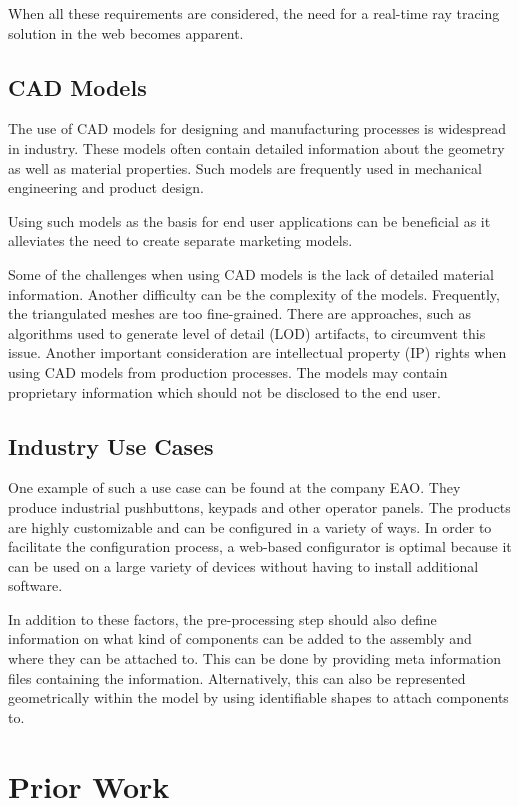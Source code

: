 When all these requirements are considered, the need for a real-time ray tracing solution in the web becomes apparent.

\subsection{CAD Models}

The use of CAD models for designing and manufacturing processes is widespread in industry. These models often contain detailed information about the geometry as well as material properties. Such models are frequently used in mechanical engineering and product design.

Using such models as the basis for end user applications can be beneficial as it alleviates the need to create separate marketing models.

Some of the challenges when using CAD models is the lack of detailed material information. Another difficulty can be the complexity of the models. Frequently, the triangulated meshes are too fine-grained. There are approaches, such as algorithms used to generate level of detail (LOD) artifacts, to circumvent this issue.
Another important consideration are intellectual property (IP) rights when using CAD models from production processes. The models may contain proprietary information which should not be disclosed to the end user.

\subsection{Industry Use Cases}

One example of such a use case can be found at the company EAO. They produce industrial pushbuttons, keypads and other operator panels. The products are highly customizable and can be configured in a variety of ways. In order to facilitate the configuration process, a web-based configurator is optimal because it can be used on a large variety of devices without having to install additional software.

In addition to these factors, the pre-processing step should also define information on what kind of components can be added to the assembly and where they can be attached to. This can be done by providing meta information files containing the information. Alternatively, this can also be represented geometrically within the model by using identifiable shapes to attach components to.

\section{Prior Work}


